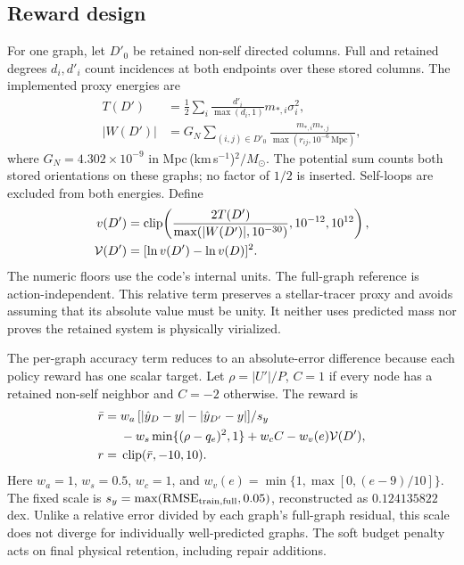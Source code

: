 \subsection{Reward design}
\label{sec:reward}
For one graph, let $D'_0$ be retained non-self directed columns. Full and retained degrees $d_i,d'_i$ count incidences at both endpoints over these stored columns. The implemented proxy energies are
\begin{align}
 T(D')&=\tfrac12\sum_i\frac{d'_i}{\max(d_i,1)}m_{*,i}\sigma_i^2,\\
 |W(D')|&=G_{\!N}\sum_{(i,j)\in D'_0}
 \frac{m_{*,i}m_{*,j}}{\max(r_{ij},10^{-6}\,\mathrm{Mpc})},
\end{align}
where $G_{\!N}=4.302\times10^{-9}$ in Mpc\,(km\,s$^{-1}$)$^2/M_\odot$. The potential sum counts both stored orientations on these graphs; no factor of $1/2$ is inserted. Self-loops are excluded from both energies. Define
\begin{align}
 v(D')&=\operatorname{clip}\!\left(\frac{2T(D')}{\max(|W(D')|,10^{-30})},10^{-12},10^{12}\right),\\
 \mathcal V(D')&=[\ln v(D')-\ln v(D)]^2.
 \label{eq:virial}
\end{align}
The numeric floors use the code's internal units. The full-graph reference is action-independent. This relative term preserves a stellar-tracer proxy and avoids assuming that its absolute value must be unity. It neither uses predicted mass nor proves the retained system is physically virialized.

The per-graph accuracy term reduces to an absolute-error difference because each policy reward has one scalar target. Let $\rho=|U'|/P$, $C=1$ if every node has a retained non-self neighbor and $C=-2$ otherwise. The reward is
\begin{equation}
\begin{split}
 \bar r={}&w_a\,[|\hat y_D-y|-|\hat y_{D'}-y|]/s_y\\
 &-w_s\min\{(\rho-q_e)^2,1\}+w_cC-w_v(e)\mathcal V(D'),\\
 r={}&\operatorname{clip}(\bar r,-10,10).
\end{split}
\label{eq:reward}
\end{equation}
Here $w_a=1$, $w_s=0.5$, $w_c=1$, and $w_v(e)=\min\{1,\max[0,(e-9)/10]\}$. The fixed scale is $s_y=\max(\operatorname{RMSE}_{\mathrm{train,full}},0.05)$, reconstructed as $0.124135822$ dex. Unlike a relative error divided by each graph's full-graph residual, this scale does not diverge for individually well-predicted graphs. The soft budget penalty acts on final physical retention, including repair additions.


